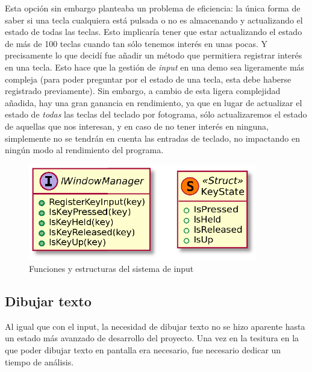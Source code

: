 Esta opción sin embargo planteaba un problema de eficiencia: la única forma de saber si una tecla cualquiera está pulsada o no es almacenando y actualizando el estado de todas las teclas. Esto implicaría tener que estar actualizando el estado de más de 100 teclas cuando tan sólo tenemos interés en unas pocas. Y precisamente lo que decidí fue añadir un método que permitiera registrar interés en una tecla. Esto hace que la gestión de \emph{input} en una demo sea ligeramente más compleja (para poder preguntar por el estado de una tecla, esta debe haberse registrado previamente). Sin embargo, a cambio de esta ligera complejidad añadida, hay una gran ganancia en rendimiento, ya que en lugar de actualizar el estado de \emph{todas} las teclas del teclado por fotograma, sólo actualizaremos el estado de aquellas que nos interesan, y en caso de no tener interés en ninguna, simplemente no se tendrán en cuenta las entradas de teclado, no impactando en ningún modo al rendimiento del programa.\\

%
%
%
%

\begin{figure}[h]
	\centering
	\includegraphics[width=10cm]{archivos/inputuml}
	\caption{Funciones y estructuras del sistema de input}
	\label{fig:input}
\end{figure}

\subsection{Dibujar texto}

Al igual que con el input, la necesidad de dibujar texto no se hizo aparente hasta un estado más avanzado de desarrollo del proyecto. Una vez en la tesitura en la que poder dibujar texto en pantalla era necesario, fue necesario dedicar un tiempo de análisis.\\


